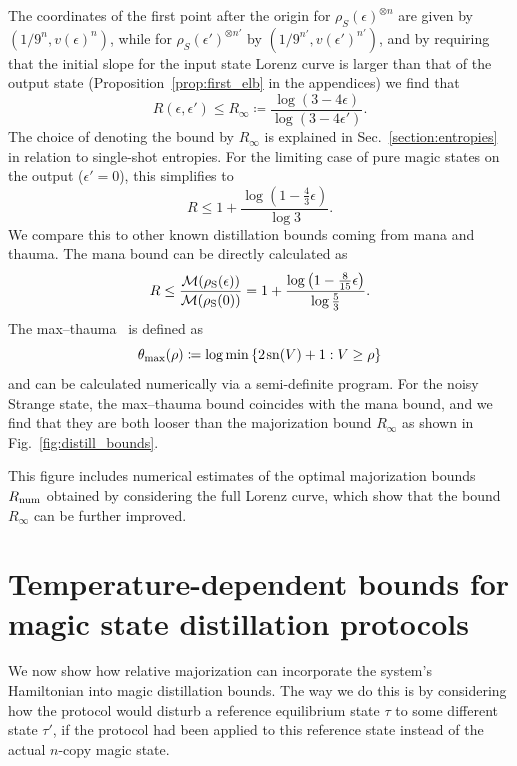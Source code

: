 \documentclass[pra,
aps,
twocolumn,
superscriptaddress,
groupedaddress,
nofootinbib,
reprint
]{revtex4-1}
\begin{document}
The coordinates of the first point after the origin for $\rho_S(\epsilon)^{\otimes n}$ are given by $(1/9^n, v(\epsilon)^n)$, while for $\rho_S(\epsilon')^{\otimes n'}$ by $(1/9^{n'}, v(\epsilon')^{n'})$, and by requiring that the initial slope for the input state Lorenz curve is larger than that of the output state (Proposition~\ref{prop:first_elb} in the appendices) we find that
\begin{equation}\label{eq:unital-bound}
	R(\epsilon, \epsilon') \leq R_\infty \coloneqq\frac{\log (3-4\epsilon)}{\log (3-4\epsilon')}.
\end{equation}
The choice of denoting the bound by $R_\infty$ is explained in Sec.~\ref{section:entropies} in relation to single-shot entropies. For the limiting case of pure magic states on the output ($\epsilon'=0$), this simplifies to
\begin{equation}
	R \leq 1 + \frac{\log (1 - \frac{4}{3} \epsilon)}{\log 3}.
\end{equation}
We compare this to other known distillation bounds coming from mana and thauma. The mana bound can be directly calculated as
\begin{equation}
	R \leq \frac{{\mathcal M}(\rho_{\rm{S}}(\epsilon))}{{\mathcal M}(\rho_{\rm{S}}(0))} = 1 + \frac{\log \left(1 - \frac{8}{15}\epsilon \right)}{\log \frac{5}{3}}.
\end{equation}
The max--thauma~\cite{Wang_2020} is defined as
\begin{equation}
	\theta_{\rm{max}}(\rho) \coloneqq \log \min{\{2\hspace{1pt} {{\rm{sn}}(V)} +1 : V \geq \rho\}}
\end{equation}
and can be calculated numerically via a semi-definite program. For the noisy Strange state, the max--thauma bound coincides with the mana bound, and we find that they are both looser than the majorization bound $R_\infty$ as shown in Fig.~\ref{fig:distill_bounds}. 

This figure includes numerical estimates of the optimal majorization bounds $R_{\rm{num}}$ obtained by considering the full Lorenz curve, which show that the bound $R_\infty$ can be further improved.

\section{Temperature-dependent bounds for magic state distillation protocols}
\label{sec:stab}

We now show how relative majorization can incorporate the system's Hamiltonian into magic distillation bounds. The way we do this is by considering how the protocol would disturb a reference equilibrium state $\tau$ to some different state $\tau'$, if the protocol had been applied to this reference state instead of the actual $n$-copy magic state. 
\end{document}
